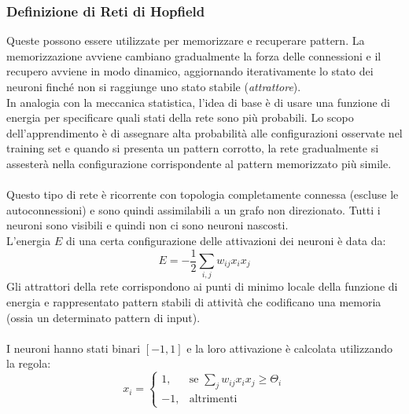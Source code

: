 \subsubsection{Definizione di Reti di Hopfield}
Queste possono essere utilizzate per memorizzare e recuperare pattern. La memorizzazione avviene cambiano gradualmente la forza delle connessioni e il recupero avviene in modo dinamico, aggiornando iterativamente lo stato dei neuroni finché non si raggiunge uno stato stabile (\textit{attrattore}).\\
In analogia con la meccanica statistica, l'idea di base è di usare una funzione di energia per specificare quali stati della rete sono più probabili. Lo scopo dell'apprendimento è di assegnare alta probabilità alle configurazioni osservate nel training set e quando si presenta un pattern corrotto, la rete gradualmente si assesterà nella configurazione corrispondente al pattern memorizzato più simile.\\
\\
Questo tipo di rete è ricorrente con topologia completamente connessa (escluse le autoconnessioni) e sono quindi assimilabili a un grafo non direzionato. Tutti i neuroni sono visibili e quindi non ci sono neuroni nascosti.\\
L'energia \(E\) di una certa configurazione delle attivazioni dei neuroni è data da:
\[E=-\frac{1}{2}\sum_{i,j}w_{ij}x_ix_j\]
Gli attrattori della rete corrispondono ai punti di minimo locale della funzione di energia e rappresentato pattern stabili di attività che codificano una memoria (ossia un determinato pattern di input).\\
\\
I neuroni hanno stati binari \([-1, 1]\) e la loro attivazione è calcolata utilizzando la regola:
\[
    x_i = 
    \begin{cases} 
        1, & \mbox{se } \sum_j w_{ij}x_ix_j \geq \Theta_i \\
        -1, & \mbox{altrimenti}
    \end{cases}
\]

